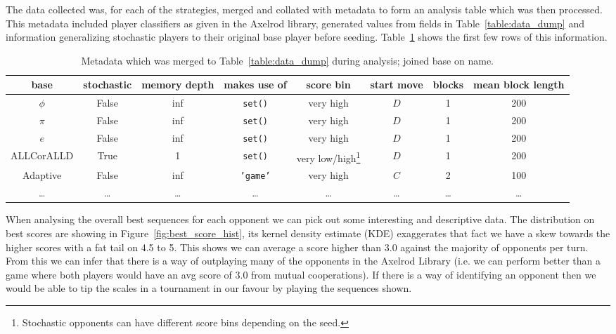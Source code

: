 The data collected was, for each of the strategies, merged and collated with metadata to form an analysis table which was then processed.
This metadata included player classifiers as given in the Axelrod library, generated values from fields in Table~\ref{table:data_dump} and information generalizing stochastic players to their original base player before seeding.
Table~\ref{table:meta_data} shows the first few rows of this information.

\begin{table}[ht]
    \centering
    \begin{tabular}{cccccccc}
        \toprule
        base & stochastic & memory depth & makes use of & score bin & start move & blocks & mean block length\\
        \midrule
        $\phi$ & False & inf & \texttt{set()} & very high &  $D$ & 1 & 200\\

        $\pi$ & False & inf & \texttt{set()} & very high &  $D$ & 1 & 200\\

        $e$ & False & inf & \texttt{set()} & very high &  $D$ & 1 & 200\\

        ALLCorALLD & True & 1 & \texttt{set()} & very low/high\footnote{Stochastic opponents can have different score bins depending on the seed.} &  $D$ & 1 & 200\\

        Adaptive & False & inf & \texttt{'game'} & very high &  $C$ & 2 & 100\\

        \ldots & \ldots & \ldots & \ldots & \ldots & \ldots & \ldots & \ldots\\    
        \bottomrule
    \end{tabular}
    \caption{Metadata which was merged to Table~\ref{table:data_dump} during analysis; joined base on name.}\label{table:meta_data}
\end{table}

When analysing the overall best sequences for each opponent we can pick out some interesting and descriptive data.
The distribution on best scores are showing in Figure~\ref{fig:best_score_hist}, its kernel density estimate (KDE) \cite{tukey1977exploratory} exaggerates that fact we have a skew towards the higher scores with a fat tail on 4.5 to 5.
This shows we can average a score higher than 3.0 against the majority of opponents per turn.
From this we can infer that there is a way of outplaying many of the opponents in the Axelrod Library (i.e. we can perform better than a game where both players would have an avg score of $3.0$ from mutual cooperations).
If there is a way of identifying an opponent then we would be able to tip the scales in a tournament in our favour by playing the sequences shown.

